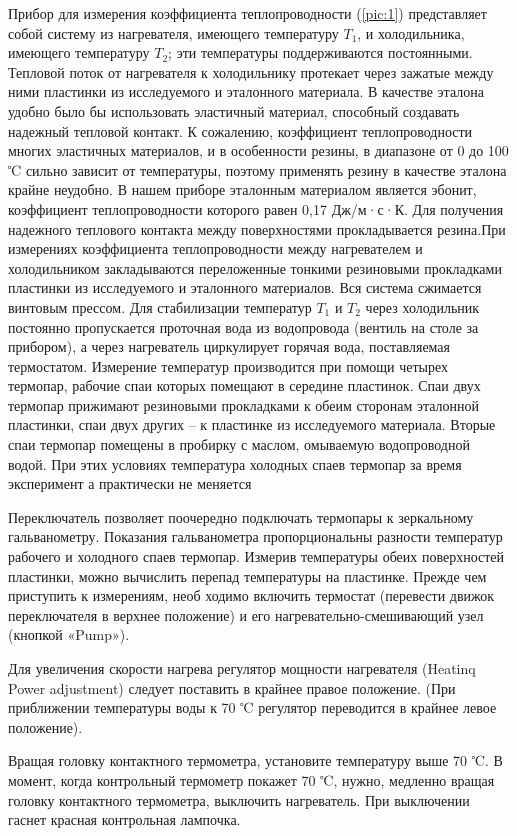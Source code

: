 \documentclass[a4paper,11.5pt]{article} %
\begin{document}
Прибор для измерения коэффициента теплопроводности (\ref{pic:1}) представляет собой систему из нагревателя, имеющего температуру $T_1$, и холодильника, имеющего температуру $T_2$; эти температуры поддерживаются постоянными. Тепловой поток от нагревателя к холодильнику протекает через зажатые
между ними пластинки из исследуемого и эталонного материала. В качестве эталона удобно было бы использовать эластичный материал, способный создавать надежный тепловой контакт. К сожалению, коэффициент теплопроводности многих эластичных материалов, и в особенности резины, в диапазоне от 0 до 100 ℃ сильно зависит от температуры, поэтому применять резину в качестве эталона крайне неудобно. В нашем приборе эталонным материалом является эбонит, коэффициент теплопроводности которого равен 0,17 Дж/м·с·К. Для получения надежного теплового контакта между поверхностями прокладывается резина.При измерениях коэффициента теплопроводности между нагревателем и холодильником закладываются переложенные тонкими резиновыми прокладками пластинки из исследуемого и эталонного материалов. Вся система сжимается винтовым прессом.
Для стабилизации температур $T_1$ и $T_2$ через холодильник постоянно пропускается проточная вода из водопровода (вентиль на столе за прибором), а через нагреватель циркулирует горячая вода, поставляемая термостатом. Измерение температур производится при помощи четырех термопар, рабочие спаи которых помещают в середине пластинок. Спаи двух термопар прижимают резиновыми прокладками к обеим сторонам эталонной пластинки, спаи двух других -- к пластинке из исследуемого материала. Вторые спаи термопар помещены в пробирку с маслом, омываемую водопроводной водой. При этих условиях температура холодных спаев термопар за время эксперимент а практически не меняется

Переключатель позволяет поочередно подключать термопары к зеркальному гальванометру. Показания гальванометра пропорциональны разности температур рабочего и холодного спаев термопар. Измерив температуры обеих поверхностей пластинки, можно вычислить перепад температуры на пластинке. Прежде чем приступить к измерениям, необ ходимо включить термостат (перевести движок переключателя в верхнее положение) и его нагревательно-смешивающий узел (кнопкой «Pump»).

Для увеличения скорости нагрева регулятор мощности нагревателя (Heatinq
Power adjustment) следует поставить в крайнее правое положение. (При приближении температуры воды к 70 ℃ регулятор переводится в крайнее левое положение).

Вращая головку контактного термометра, установите температуру выше 70 ℃. В момент, когда контрольный термометр покажет 70 ℃, нужно, медленно вращая головку контактного термометра, выключить нагреватель. При выключении гаснет красная контрольная лампочка.
\end{document}
